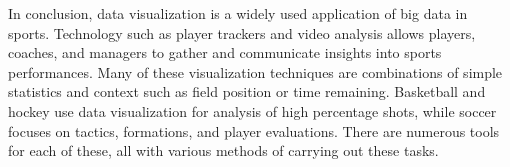 \documentclass[sigconf]{acmart}
\begin{document}
In conclusion, data visualization is a widely used application of big data in sports. Technology such as player trackers and video analysis allows players, coaches, and managers to gather and communicate insights into sports performances. Many of these visualization techniques are combinations of simple statistics and context such as field position or time remaining. Basketball and hockey use data visualization for analysis of high percentage shots, while soccer focuses on tactics, formations, and player evaluations. There are numerous tools for each of these, all with various methods of carrying out these tasks.




 


\end{document}
